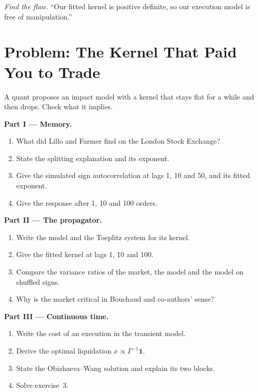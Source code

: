 \begin{exercise}[$\star\star\star$]\label{exo:mx:transient-impact-and-propagator-models:8}
\emph{Find the flaw.} ``Our fitted kernel is positive definite, so our execution model is free of manipulation.''
\end{exercise}

\section{Problem: The Kernel That Paid You to Trade}

\begin{problem}\label{pb:mx:transient-impact-and-propagator-models:1}
A quant proposes an impact model with a kernel that stays flat for a while and then drops. Check what it implies.

\medskip\noindent\textbf{Part I --- Memory.}
\begin{enumerate}
\item What did Lillo and Farmer find on the London Stock Exchange?
\item State the splitting explanation and its exponent.
\item Give the simulated sign autocorrelation at lags 1, 10 and 50, and its fitted exponent.
\item Give the response after 1, 10 and 100 orders.
\end{enumerate}

\medskip\noindent\textbf{Part II --- The propagator.}
\begin{enumerate}[resume]
\item Write the model and the Toeplitz system for its kernel.
\item Give the fitted kernel at lags 1, 10 and 100.
\item Compare the variance ratios of the market, the model and the model on shuffled signs.
\item Why is the market critical in Bouchaud and co-authors' sense?
\end{enumerate}

\medskip\noindent\textbf{Part III --- Continuous time.}
\begin{enumerate}[resume]
\item Write the cost of an execution in the transient model.
\item Derive the optimal liquidation $x\propto\Gamma^{-1}\mathbf 1$.
\item State the Obizhaeva--Wang solution and explain its two blocks.
\item Solve exercise~3.
\end{enumerate}


\end{problem}
